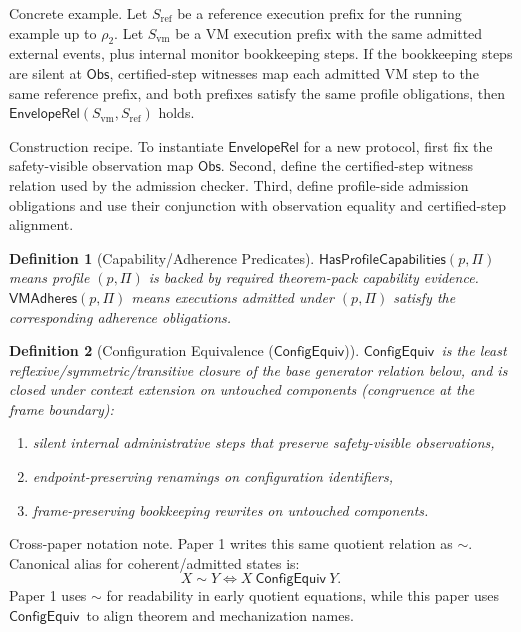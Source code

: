 \documentclass[a4paper,10pt,twocolumn,english]{article}
\numberwithin{equation}{section}
\theoremstyle{paperdef}
\newtheorem{definition}{Definition}[section]
\theoremstyle{paperplain}
\theoremstyle{paperdef}
\theoremstyle{paperremark}
\theoremstyle{paperdef}
\newcommand{\EnvelopeRel}{\ensuremath{\mathsf{EnvelopeRel}}}
\newcommand{\ConfigEquiv}{\ensuremath{\mathsf{ConfigEquiv}}}
\newcommand{\Obs}{\ensuremath{\mathsf{Obs}}}
\newcommand{\VMAdheres}{\ensuremath{\mathsf{VMAdheres}}}
\newcommand{\HasProfileCapabilities}{\ensuremath{\mathsf{HasProfileCapabilities}}}
\begin{document}
Concrete example. Let $S_{\mathrm{ref}}$ be a reference execution prefix for the running example up to $\rho_2$. Let $S_{\mathrm{vm}}$ be a VM execution prefix with the same admitted external events, plus internal monitor bookkeeping steps. If the bookkeeping steps are silent at $\Obs$, certified-step witnesses map each admitted VM step to the same reference prefix, and both prefixes satisfy the same profile obligations, then $\EnvelopeRel(S_{\mathrm{vm}}, S_{\mathrm{ref}})$ holds.

Construction recipe. To instantiate $\EnvelopeRel$ for a new protocol, first fix the safety-visible observation map $\Obs$. Second, define the certified-step witness relation used by the admission checker. Third, define profile-side admission obligations and use their conjunction with observation equality and certified-step alignment.

\begin{definition}[Capability/Adherence Predicates]
	$\HasProfileCapabilities(p,\Pi)$ means profile $(p,\Pi)$ is backed by required theorem-pack
	capability evidence. $\VMAdheres(p,\Pi)$ means executions admitted under $(p,\Pi)$ satisfy
	the corresponding adherence obligations.
\end{definition}

\begin{definition}[Configuration Equivalence (\ConfigEquiv)]
	\label{def:p3-config-equiv}
	\ConfigEquiv\ is the least reflexive/symmetric/transitive closure of the
	base generator relation below, and is closed under context extension on
	untouched components (congruence at the frame boundary):
	\begin{enumerate}
		\item silent internal administrative steps that preserve safety-visible
		      observations,
		\item endpoint-preserving renamings on configuration identifiers,
		\item frame-preserving bookkeeping rewrites on untouched components.
	\end{enumerate}
\end{definition}

Cross-paper notation note. Paper 1 writes this same quotient relation as
$\sim$. Canonical alias for coherent/admitted states is:
\[
	X \sim Y \iff X\ \ConfigEquiv\ Y.
\]
Paper 1 uses $\sim$ for readability in early quotient equations, while this
paper uses \ConfigEquiv\ to align theorem and mechanization names.
\end{document}
